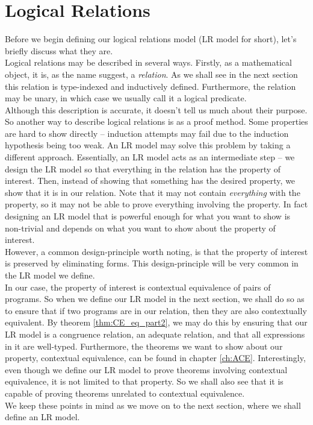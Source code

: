 \documentclass[twoside,11pt,openright]{report}
\theoremstyle{definition}
\begin{document}
\section{Logical Relations}
Before we begin defining our logical relations model (LR model for short), let's briefly discuss what they are.\\
Logical relations may be described in several ways. Firstly, as a mathematical object, it is, as the name suggest, a \textit{relation}. As we shall see in the next section this relation is type-indexed and inductively defined. Furthermore, the relation may be unary, in which case we usually call it a logical predicate.\\
Although this description is accurate, it doesn't tell us much about their purpose. So another way to describe logical relations is as a proof method. Some properties are hard to show directly – induction attempts may fail due to the induction hypothesis being too weak. An LR model may solve this problem by taking a different approach. Essentially, an LR model acts as an intermediate step – we design the LR model so that everything in the relation has the property of interest. Then, instead of showing that something has the desired property, we show that it is in our relation. Note that it may not contain \textit{everything} with the property, so it may not be able to prove everything involving the property. In fact designing an LR model that is powerful enough for what you want to show is non-trivial and depends on what you want to show about the property of interest.\\
However, a common design-principle worth noting, is that the property of interest is preserved by eliminating forms. This design-principle will be very common in the LR model we define.\\
In our case, the property of interest is contextual equivalence of pairs of programs. So when we define our LR model in the next section, we shall do so as to ensure that if two programs are in our relation, then they are also contextually equivalent. By theorem \ref{thm:CE_eq_part2}, we may do this by ensuring that our LR model is a congruence relation, an adequate relation, and that all expressions in it are well-typed. Furthermore, the theorems we want to show about our property, contextual equivalence, can be found in chapter \ref{ch:ACE}. Interestingly, even though we define our LR model to prove theorems involving contextual equivalence, it is not limited to that property. So we shall also see that it is capable of proving theorems unrelated to contextual equivalence.\\
We keep these points in mind as we move on to the next section, where we shall define an LR model.
\end{document}
